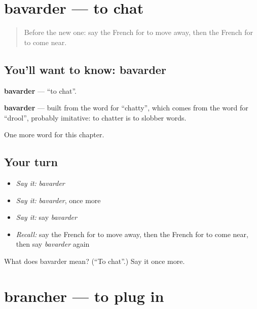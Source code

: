 \section[bavarder]{bavarder — to chat}

\label{lesson:FR-C150-bavarder}



\begin{quote}
Before the new one: say the French for to move away, then the French for to come near.
\end{quote}

\subsection*{You'll want to know: bavarder}
\textbf{bavarder} — \textquotedblleft{}to chat\textquotedblright{}.

\begin{cousinweb}
\textbf{bavarder} — built from the word for \textquotedblleft{}chatty\textquotedblright{}, which comes from the word for \textquotedblleft{}drool\textquotedblright{}, probably imitative: to chatter is to slobber words.
\end{cousinweb}

\begin{grammarlens}[title={What you've built}]
One more word for this chapter.
\end{grammarlens}

\subsection*{Your turn}
\begin{itemize}
\raggedright
  \item \emph{Say it:} \emph{bavarder}
  \item \emph{Say it:} \emph{bavarder}, once more
  \item \emph{Say it:} say \emph{bavarder}
  \item \emph{Recall:} say the French for to move away, then the French for to come near, then say \emph{bavarder} again
\end{itemize}

\begin{tcolorbox}[breakable,colback=teal!4,colframe=teal!35!black,title={Before you move on}]
What does bavarder mean? (\textquotedblleft{}To chat\textquotedblright{}.) Say it once more.
\end{tcolorbox}
\section[brancher]{brancher — to plug in}

